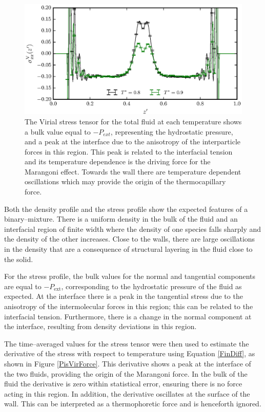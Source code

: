 \begin{figure}[h]
\centering
\includegraphics[scale=0.8]{PisVirStress}
\caption{The Virial stress tensor for the total fluid at each temperature shows a bulk value equal to $-P_{ext}$, representing the hydrostatic pressure, and a peak at the interface due to the anisotropy of the interparticle forces in this region.
This peak is related to the interfacial tension and its temperature dependence is the driving force for the Marangoni effect.
Towards the wall there are temperature dependent oscillations which may provide the origin of the thermocapillary force.
}
\label{PisVirStress}
\end{figure}

Both the density profile and the stress profile show the expected features of a binary--mixture. 
There is a uniform density in the bulk of the fluid and an interfacial region of finite width where the density of one species falls sharply and the density of the other increases.
Close to the walls, there are large oscillations in the density that are a consequence of structural layering in the fluid close to the solid.

For the stress profile, the bulk values for the normal and tangential components are equal to $-P_{\mathrm{ext}}$, corresponding to the hydrostatic pressure of the fluid as expected.
At the interface there is a peak in the tangential stress due to the anisotropy of the intermolecular forces in this region; this can be related to the interfacial tension.\cite{Marchand2011}
Furthermore, there is a change in the normal component at the interface, resulting from density deviations in this region.

The time--averaged values for the stress tensor were then used to estimate the derivative of the stress with respect to temperature using Equation \ref{FinDiff}, as shown in Figure \ref{PisVirForce}.
This derivative shows a peak at the interface of the two fluids, providing the origin of the Marangoni force.
In the bulk of the fluid the derivative is zero within statistical error, ensuring there is no force acting in this region.
In addition, the derivative oscillates at the surface of the wall.
This can be interpreted as a thermophoretic force and is henceforth ignored.

